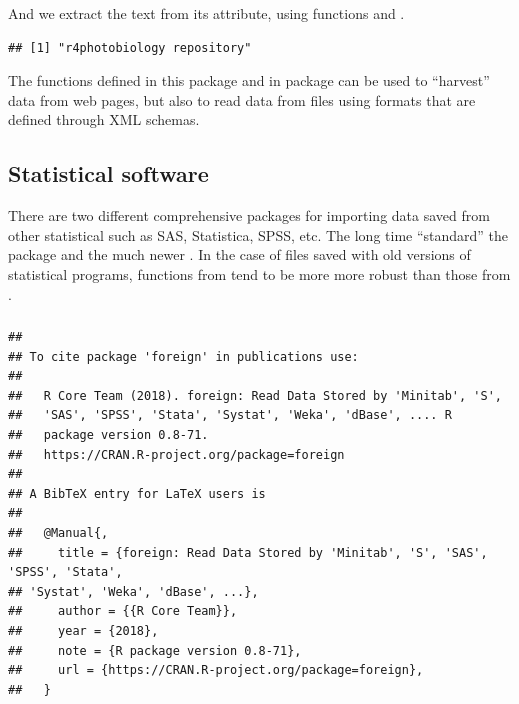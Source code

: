 \documentclass[krantz2]{krantz}\usepackage{knitr}%
\begin{document}
And we extract the text from its  attribute, using functions  and .

\begin{knitrout}\footnotesize
{}\color{fgcolor}\begin{kframe}
\begin{alltt}
\hlstd{(} \hlstd{))}
\end{alltt}
\begin{verbatim}
## [1] "r4photobiology repository"
\end{verbatim}
\end{kframe}
\end{knitrout}

The functions defined in this package and in package  can be used to ``harvest'' data from web pages, but also to read data from files using formats that are defined through XML schemas.

\subsection{Statistical software}\label{sec:files:stat}

There are two different comprehensive packages for importing data saved from other statistical such as SAS, Statistica, SPSS, etc. The long time ``standard'' the  package and the much newer . In the case of files saved with old versions of statistical programs, functions from  tend to be more more robust than those from .

\subsubsection[foreign]{}

\begin{knitrout}\footnotesize
{}\color{fgcolor}\begin{kframe}
\begin{alltt}
\hlstd{(} \hlstd{=} \hlstd{)}
\end{alltt}
\begin{verbatim}
## 
## To cite package 'foreign' in publications use:
## 
##   R Core Team (2018). foreign: Read Data Stored by 'Minitab', 'S',
##   'SAS', 'SPSS', 'Stata', 'Systat', 'Weka', 'dBase', .... R
##   package version 0.8-71.
##   https://CRAN.R-project.org/package=foreign
## 
## A BibTeX entry for LaTeX users is
## 
##   @Manual{,
##     title = {foreign: Read Data Stored by 'Minitab', 'S', 'SAS', 'SPSS', 'Stata',
## 'Systat', 'Weka', 'dBase', ...},
##     author = {{R Core Team}},
##     year = {2018},
##     note = {R package version 0.8-71},
##     url = {https://CRAN.R-project.org/package=foreign},
##   }
\end{verbatim}
\end{kframe}
\end{knitrout}
\end{document}
